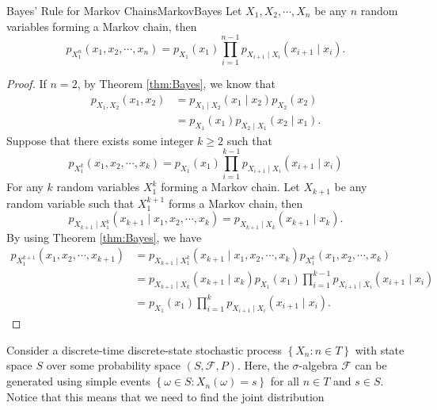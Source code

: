\documentclass[math, code]{amznotes}
\theoremstyle{remark}
\begin{document}
\begin{corbox}{Bayes' Rule for Markov Chains}{MarkovBayes}
    Let $X_1, X_2, \cdots, X_n$ be any $n$ random variables forming a Markov chain, then 
    \begin{equation*}
        p_{X_1^n}\left(x_1, x_2, \cdots, x_n\right) = p_{X_1}\left(x_1\right)\prod_{i = 1}^{n - 1}p_{X_{i + 1} \mid X_i}\left(x_{i + 1} \mid x_i\right).
    \end{equation*}
    \tcblower
    \begin{proof}
        If $n = 2$, by Theorem \ref{thm:Bayes}, we know that 
        \begin{align*}
            p_{X_1, X_2}\left(x_1, x_2\right) & = p_{X_1 \mid X_2}\left(x_1 \mid x_2\right)p_{X_2}\left(x_2\right) \\
            & = p_{X_1}\left(x_1\right)p_{X_2 \mid X_1}\left(x_2 \mid x_1\right).
        \end{align*}
        Suppose that there exists some integer $k \geq 2$ such that 
        \begin{equation*}
            p_{X_1^k}\left(x_1, x_2, \cdots, x_k\right) = p_{X_1}\left(x_1\right)\prod_{i = 1}^{k - 1}p_{X_{i + 1} \mid X_i}\left(x_{i + 1} \mid x_i\right)
        \end{equation*}
        For any $k$ random variables $X_1^k$ forming a Markov chain. Let $X_{k + 1}$ be any random variable such that $X_1^{k + 1}$ forms a Markov chain, then 
        \begin{equation*}
            p_{X_{k + 1} \mid X_1^{k}}\left(x_{k + 1} \mid x_1, x_2, \cdots, x_k\right) = p_{X_{k + 1} \mid X_k}\left(x_{k + 1} \mid x_k\right).
        \end{equation*}
        By using Theorem \ref{thm:Bayes}, we have
        \begin{align*}
            p_{X_1^{k + 1}}\left(x_1, x_2, \cdots, x_{k + 1}\right) & = p_{X_{k + 1} \mid X_1^{k}}\left(x_{k + 1} \mid x_1, x_2, \cdots, x_k\right)p_{X_1^k}\left(x_1, x_2, \cdots, x_k\right) \\
            & = p_{X_{k + 1} \mid X_k}\left(x_{k + 1} \mid x_k\right)p_{X_1}\left(x_1\right)\prod_{i = 1}^{k - 1}p_{X_{i + 1} \mid X_i}\left(x_{i + 1} \mid x_i\right) \\
            & = p_{X_1}\left(x_1\right)\prod_{i = 1}^{k}p_{X_{i + 1} \mid X_i}\left(x_{i + 1} \mid x_i\right).
        \end{align*}
    \end{proof}
\end{corbox}
Consider a discrete-time discrete-state stochastic process $\left\{X_n \colon n \in T\right\}$ with state space $S$ over some probability space $\left(S, \mathcal{F}, P\right)$. Here, the $\sigma$-algebra $\mathcal{F}$ can be generated using simple events $\left\{\omega \in S \colon X_n\left(\omega\right) = s\right\}$ for all $n \in T$ and $s \in S$. Notice that this means that we need to find the joint distribution 
\end{document}
